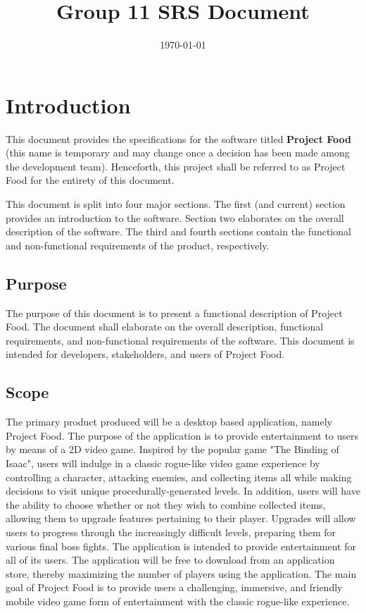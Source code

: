 \documentclass[12pt, titlepage]{article}
\title{Group 11 SRS Document}
\author{}
\date{\today}
\begin{document}
\maketitle

\tableofcontents
\listoffigures

\newpage


\section{Introduction}
This document provides the specifications for the software titled \textbf{Project Food} (this name is temporary and may change once a decision has been made among the development team). Henceforth, this project shall be referred to as Project Food for the entirety of this document.

This document is split into four major sections. The first (and current) section provides an introduction to the software. Section two elaborates on the overall description of the software. The third and fourth sections contain the functional and non-functional requirements of the product, respectively.

  \subsection{Purpose} 
  The purpose of this document is to present a functional description of Project Food. The document shall elaborate on the overall description, functional requirements, and non-functional requirements of the software. This document is intended for developers, stakeholders, and users of Project Food.
  \subsection{Scope}

  The primary product produced will be a desktop based application, namely Project Food. The purpose of the application is to provide entertainment to users by means of a 2D video game. Inspired by the popular game "The Binding of Isaac", users will indulge in a classic rogue-like video game experience by controlling a character, attacking enemies, and collecting items all while making decisions to visit unique procedurally-generated levels. In addition, users will have the ability to choose whether or not they wish to combine collected items, allowing them to upgrade features pertaining to their player. Upgrades will allow users to progress through the increasingly difficult levels, preparing them for various final boss fights.
  The application is intended to provide entertainment for all of its users. The application will be free to download from an application store, thereby maximizing the number of players using the application. The main goal of Project Food is to provide users a challenging, immersive, and friendly mobile video game form of entertainment with the classic rogue-like experience.
\end{document}
